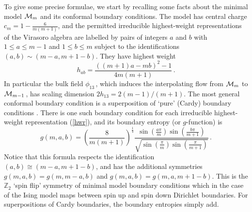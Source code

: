 \documentclass[11pt]{article}
\newcommand\ZZ{{\mathbb Z}}
\newcommand{\CM}{{\cal M}}
\newcommand\beq{\begin{equation}}
\newcommand\eeq{\end{equation}}
\begin{document}
To give some precise formulae, we start by recalling some facts about
the minimal model $\CM_m$ and its conformal boundary conditions. 
The model has central charge
$c_m=1-\frac{6}{m(m{+}1)}$, and the permitted irreducible highest-weight
representations of the Virasoro algebra are labelled by pairs of
integers $a$ and $b$ with $1\le a\le m{-}1$ and $1\le b\le m$ subject
to the identifications $(a,b)\sim (m{-}a,m{+}1{-}b)$. They have
highest weight
\beq
h_{ab}=\frac{((m{+}1)a-mb)^2-1}{4m(m{+}1)}\,.
\label{hwr}
\eeq
In particular the bulk field $\phi_{13}$\,, which induces the
interpolating flow from $\CM_m$ to $\CM_{m-1}$\,, has scaling dimension 
$2h_{13}=2(m{-}1)/(m{+}1)$. The most general conformal boundary
condition is a superposition of `pure' (Cardy) boundary
conditions \cite{Cardy:1989ir}. There is one such boundary condition
for each irreducible highest-weight representation (\ref{hwr}), and
its boundary entropy (or $g$-function) is \cite{Affleck:1991tk}
\beq
g(m,a,b)=
\left(\frac{8}{m(m+1)}\right)^{\frac{1}{4}}\frac{\sin(\frac{a\pi}{m})
\sin(\frac{b\pi}{m+1})}{\sqrt{\sin(\frac{\pi}{m})\sin(\frac{\pi}{m+1})}}\,.
\label{gmab}
\eeq
Notice that this formula respects the identification $(a,b)\cong
(m{-}a,m{+}1{-}b)$, and has the additional symmetries
$g(m,a,b)=g(m,m{-}a,b)$ and $g(m,a,b)=g(m,a,m{+}1{-}b)$. 
This is the $\ZZ_2$ `spin flip' symmetry
of minimal model boundary conditions which 
in the case of the Ising model
 maps between spin up and spin down Dirichlet
boundaries.
For superpositions of Cardy boundaries, the
boundary entropies simply add.
\end{document}
